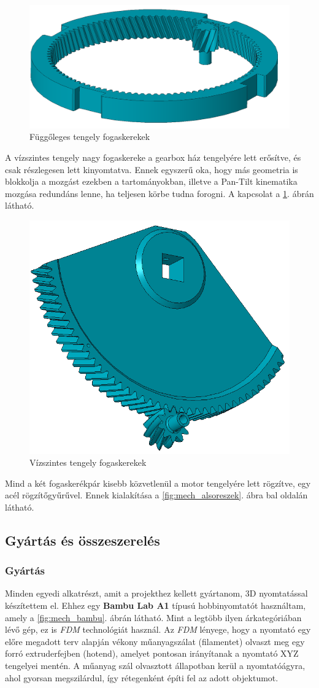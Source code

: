 \documentclass[12pt,a4paper]{article}
\begin{document}
\begin{figure}[h!]
	\centering
	\includegraphics[width=0.1\linewidth]{mech_fogpar1}
	\caption{Függőleges tengely fogaskerekek}
	\label{fig:mech_fogpar1}
\end{figure}

A vízszintes tengely nagy fogaskereke a gearbox ház tengelyére lett erősítve, és csak részlegesen lett kinyomtatva. Ennek egyszerű oka, hogy más geometria is blokkolja a mozgást ezekben a tartományokban, illetve a Pan-Tilt kinematika mozgása redundáns lenne, ha teljesen körbe tudna forogni. A kapcsolat a \ref{fig:mech_fogpar1}. ábrán látható.

\begin{figure}[h!]
	\centering
	\includegraphics[width=0.1\linewidth]{mech_fogpar2}
	\caption{Vízszintes tengely fogaskerekek}
	\label{fig:mech_fogpar2}
\end{figure}

Mind a két fogaskerékpár kisebb közvetlenül a motor tengelyére lett rögzítve, egy acél rögzítőgyűrűvel. Ennek kialakítása a \ref{fig:mech_alsoreszek}. ábra bal oldalán látható.

\pagebreak

\subsection{Gyártás és összeszerelés}
\subsubsection{Gyártás}



Minden egyedi alkatrészt, amit a projekthez kellett gyártanom, 3D nyomtatással készítettem el. Ehhez egy \textbf{Bambu Lab A1} \cite{bambu} típusú hobbinyomtatót használtam, amely a \ref{fig:mech_bambu}. ábrán látható. Mint a legtöbb ilyen árkategóriában lévő gép, ez is \textsl{FDM} technológiát használ. Az \textsl{FDM} lényege, hogy a nyomtató egy előre megadott terv alapján vékony műanyagszálat (filamentet) olvaszt meg egy forró extruderfejben (hotend), amelyet pontosan irányítanak a nyomtató XYZ tengelyei mentén. A műanyag szál olvasztott állapotban kerül a nyomtatóágyra, ahol gyorsan megszilárdul, így rétegenként építi fel az adott objektumot.\\
\end{document}
